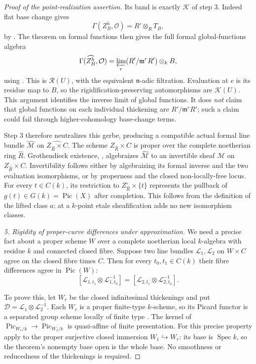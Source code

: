 \begin{proof}[Proof of the point-realization assertion]
Its band is exactly $\mathcal K$ of step 3.
Indeed flat base change gives
\[
 \Gamma(Z_B^h,\mathcal O)=R'\otimes_RT_B,
\]
by \citet[Lemma 30.5.2, Tag 02KH]{D_StacksAlterationFamilies}.
The theorem on formal functions then gives
the full formal global-functions algebra
\[
 \Gamma(\widehat{Z_B^h},\mathcal O)
    =\varprojlim_r (R'/\mathfrak m^rR')\otimes_kB,
\]
using \citet[Theorem 30.20.5, Tag 02OC]{D_StacksAlterationFamilies}.
This is $\mathcal R(U)$, with the equivalent
$\mathfrak n$-adic filtration. Evaluation at
$e$ is its residue map to $B$, so the
rigidification-preserving automorphisms are
$\mathcal K(U)$.
This argument identifies the inverse limit
of global functions. It does \emph{not}
claim that global functions on each individual
thickening are $R'/\mathfrak m^rR'$; such
a claim could fail through higher-cohomology
base-change terms.

Step 3 therefore neutralizes this gerbe,
producing a compatible actual formal line
bundle $\widehat{\mathcal M}$ on
$\widehat{Z_{\widehat R}\times C}$.
The scheme $Z_{\widehat R}\times C$ is
proper over the complete noetherian ring
$\widehat R$. Grothendieck existence,
\citet[Proposition 30.25.4, Tag 088C]{D_StacksAlterationFamilies},
algebraizes $\widehat{\mathcal M}$ to an
invertible sheaf $\mathcal M$ on
$Z_{\widehat R}\times C$.
Invertibility follows either by algebraizing
its formal inverse and the two evaluation
isomorphisms, or by properness and the
closed non-locally-free locus.
For every $t\in C(k)$, its restriction to
$Z^\circ_{\widehat R}\times\{t\}$ represents
the pullback of $g(t)\in G(k)=\operatorname{Pic}(X)$
after completion. This follows from the
definition of the lifted class $a$; at a
$k$-point etale sheafification adds no new
isomorphism classes.

\emph{5. Rigidity of proper-curve differences
under approximation.}
We need a precise fact about a proper scheme
$W$ over a complete noetherian local
$k$-algebra with residue $k$ and connected
closed fibre. Suppose two line bundles
$\mathcal L_1,\mathcal L_2$ on $W\times C$
agree on the closed fibre times $C$.
Then for every $t_0,t_1\in C(k)$ their
fibre differences agree in $\operatorname{Pic}(W)$:
\begin{equation}\label{eq:C3-proper-curve-rigidity}
 [\mathcal L_{1,t_1}\otimes\mathcal L_{1,t_0}^{-1}]
   =[\mathcal L_{2,t_1}\otimes\mathcal L_{2,t_0}^{-1}].
\end{equation}

To prove this, let $W_r$ be the closed
infinitesimal thickenings and put
$\mathcal D=\mathcal L_1\otimes\mathcal L_2^{-1}$.
Each $W_r$ is a proper finite-type $k$-scheme,
so its Picard functor is a separated group
scheme locally of finite type
\citep[Proposition 1.3, p.~4]{D_ChengJiLarsonOlander2021}.
The kernel of
$\operatorname{Pic}_{W_r/k}\to\operatorname{Pic}_{W_1/k}$
is quasi-affine of finite presentation.
For this precise property apply
\citet[Proposition 1.4, p.~4, from Theorem 1.2,
p.~3]{D_ChengJiLarsonOlander2021}
to the proper surjective closed immersion
$W_1\hookrightarrow W_r$: its base is
$\operatorname{Spec}k$, so the theorem's
nonempty base open is the whole base.
No smoothness or reducedness of the
thickenings is required.


\end{proof}
